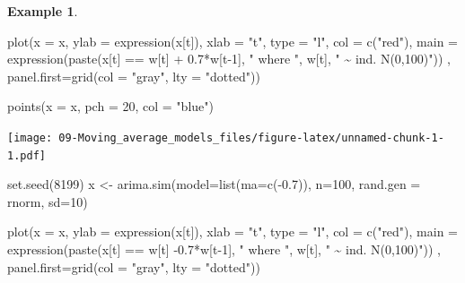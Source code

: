 \documentclass[
]{book}
\newenvironment{Shaded}{\begin{snugshade}}{\end{snugshade}}
\newcommand{\AttributeTok}[1]{\textcolor[rgb]{0.77,0.63,0.00}{#1}}
\newcommand{\DecValTok}[1]{\textcolor[rgb]{0.00,0.00,0.81}{#1}}
\newcommand{\FloatTok}[1]{\textcolor[rgb]{0.00,0.00,0.81}{#1}}
\newcommand{\FunctionTok}[1]{\textcolor[rgb]{0.00,0.00,0.00}{#1}}
\newcommand{\NormalTok}[1]{#1}
\newcommand{\OtherTok}[1]{\textcolor[rgb]{0.56,0.35,0.01}{#1}}
\newcommand{\SpecialCharTok}[1]{\textcolor[rgb]{0.00,0.00,0.00}{#1}}
\newcommand{\StringTok}[1]{\textcolor[rgb]{0.31,0.60,0.02}{#1}}
\theoremstyle{definition}
\theoremstyle{definition}
\newtheorem{example}{Example}[chapter]
\theoremstyle{definition}
\theoremstyle{definition}
\theoremstyle{remark}
\begin{document}
\begin{example}
\begin{Shaded}
\begin{Highlighting}[]
\FunctionTok{plot}\NormalTok{(}\AttributeTok{x =}\NormalTok{ x, }\AttributeTok{ylab =} \FunctionTok{expression}\NormalTok{(x[t]), }\AttributeTok{xlab =} \StringTok{"t"}\NormalTok{, }\AttributeTok{type =} 
    \StringTok{"l"}\NormalTok{, }\AttributeTok{col =} \FunctionTok{c}\NormalTok{(}\StringTok{"red"}\NormalTok{), }\AttributeTok{main =} 
    \FunctionTok{expression}\NormalTok{(}\FunctionTok{paste}\NormalTok{(x[t] }\SpecialCharTok{==}\NormalTok{ w[t] }\SpecialCharTok{+} \FloatTok{0.7}\SpecialCharTok{*}\NormalTok{w[t}\DecValTok{{-}1}\NormalTok{], }\StringTok{" where "}\NormalTok{, }
\NormalTok{    w[t], }\StringTok{" \textasciitilde{} ind. N(0,100)"}\NormalTok{)) , }\AttributeTok{panel.first=}\FunctionTok{grid}\NormalTok{(}\AttributeTok{col =} 
    \StringTok{"gray"}\NormalTok{, }\AttributeTok{lty =} \StringTok{"dotted"}\NormalTok{))}

\FunctionTok{points}\NormalTok{(}\AttributeTok{x =}\NormalTok{ x, }\AttributeTok{pch =} \DecValTok{20}\NormalTok{, }\AttributeTok{col =} \StringTok{"blue"}\NormalTok{)}
\end{Highlighting}
\end{Shaded}

\texttt{[image: 09-Moving\_average\_models\_files/figure-latex/unnamed-chunk-1-1.pdf]}

\begin{Shaded}
\begin{Highlighting}[]
\FunctionTok{set.seed}\NormalTok{(}\DecValTok{8199}\NormalTok{)}
\NormalTok{x }\OtherTok{\textless{}{-}} \FunctionTok{arima.sim}\NormalTok{(}\AttributeTok{model=}\FunctionTok{list}\NormalTok{(}\AttributeTok{ma=}\FunctionTok{c}\NormalTok{(}\SpecialCharTok{{-}}\FloatTok{0.7}\NormalTok{)), }\AttributeTok{n=}\DecValTok{100}\NormalTok{, }\AttributeTok{rand.gen =}\NormalTok{ rnorm, }\AttributeTok{sd=}\DecValTok{10}\NormalTok{)}

\FunctionTok{plot}\NormalTok{(}\AttributeTok{x =}\NormalTok{ x, }\AttributeTok{ylab =} \FunctionTok{expression}\NormalTok{(x[t]), }\AttributeTok{xlab =} \StringTok{"t"}\NormalTok{, }\AttributeTok{type =} 
    \StringTok{"l"}\NormalTok{, }\AttributeTok{col =} \FunctionTok{c}\NormalTok{(}\StringTok{"red"}\NormalTok{), }\AttributeTok{main =} 
    \FunctionTok{expression}\NormalTok{(}\FunctionTok{paste}\NormalTok{(x[t] }\SpecialCharTok{==}\NormalTok{ w[t] }\SpecialCharTok{{-}}\FloatTok{0.7}\SpecialCharTok{*}\NormalTok{w[t}\DecValTok{{-}1}\NormalTok{], }\StringTok{" where "}\NormalTok{, }
\NormalTok{    w[t], }\StringTok{" \textasciitilde{} ind. N(0,100)"}\NormalTok{)) , }\AttributeTok{panel.first=}\FunctionTok{grid}\NormalTok{(}\AttributeTok{col =} 
    \StringTok{"gray"}\NormalTok{, }\AttributeTok{lty =} \StringTok{"dotted"}\NormalTok{))}


\end{Highlighting}
\end{Shaded}
\end{example}
\end{document}
